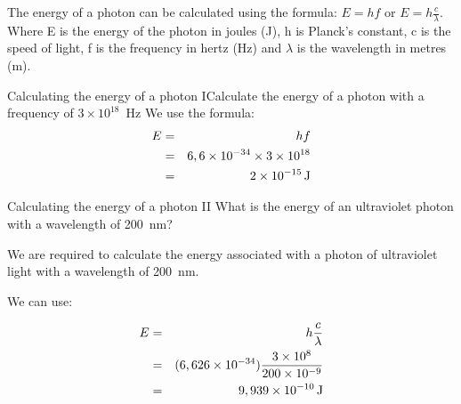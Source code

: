 \vspace{-0.5cm}


The energy of a photon can be calculated using the formula: $E=hf$ or $E=h \frac{c}{\lambda}$.
Where E is the energy of the photon in joules (J), h is Planck's constant, c is the speed of light, f is the frequency in hertz (Hz) and $\lambda$ is the wavelength in metres (m).

\begin{wex}{Calculating the energy of a photon I}{Calculate the energy of a photon with a frequency of $3 \times 10^{18}$~Hz}
{We use the formula:
\begin{eqnarray*}
E &=& hf\\
&=& 6,6 \times 10^{-34} \times 3 \times 10^{18}\\
&=& 2 \times 10^{-15} \,\mathrm{J}\\
\end{eqnarray*}}
\end{wex}

\begin{wex}{Calculating the energy of a photon II}
{What is the energy of an ultraviolet photon with a wavelength of 200~nm?}
{
We are required to calculate the energy associated with a photon of ultraviolet light with a wavelength of  200~nm.

We can use:

\begin{eqnarray*}
E & = & h\frac{c}{\lambda}\\
& = & (6,626 \times 10^{-34})\frac{3\times10^{8}}{200\times 10^{-9}}\\
& = & 9,939 \times 10^{-10}\,\mathrm{J}
\end{eqnarray*}}
\end{wex}



